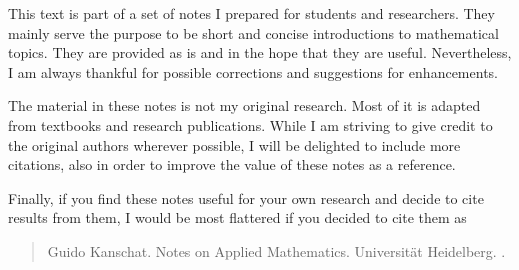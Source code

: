 
This text is part of a set of notes I prepared for students and
researchers. They mainly serve the purpose to be short and concise
introductions to mathematical topics. They are provided as is and in
the hope that they are useful. Nevertheless, I am always thankful for
possible corrections and suggestions for enhancements.

The material in these notes is not my original research. Most of it is
adapted from textbooks and research publications. While I am striving
to give credit to the original authors wherever possible, I will be
delighted to include more citations, also in order to improve the
value of these notes as a reference.

Finally, if you find these notes useful for your own research and
decide to cite results from them, I would be most flattered if you
decided to cite them as
\begin{verse}
  Guido Kanschat. Notes on Applied Mathematics. Universität
  Heidelberg. \svnyear.
\end{verse}

